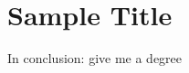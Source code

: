 \documentclass[main]{subfiles}
\begin{document}
\chapter{Sample Title}

In conclusion: give me a degree
\end{document}
